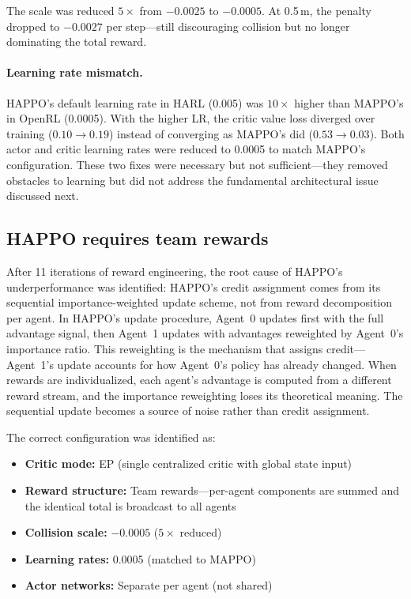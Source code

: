 The scale was reduced $5\times$ from $-0.0025$ to $-0.0005$. At 0.5\,m, the penalty dropped to $-0.0027$ per step---still discouraging collision but no longer dominating the total reward.


\paragraph{Learning rate mismatch.}
HAPPO's default learning rate in HARL (0.005) was $10\times$ higher than MAPPO's in OpenRL (0.0005). With the higher LR, the critic value loss diverged over training ($0.10 \to 0.19$) instead of converging as MAPPO's did ($0.53 \to 0.03$). Both actor and critic learning rates were reduced to 0.0005 to match MAPPO's configuration. These two fixes were necessary but not sufficient---they removed obstacles to learning but did not address the fundamental architectural issue discussed next.

\subsection{HAPPO requires team rewards}
\label{sec:happo_team_rewards}

After 11 iterations of reward engineering, the root cause of HAPPO's underperformance was identified: HAPPO's credit assignment comes from its sequential importance-weighted update scheme, not from reward decomposition per agent. In HAPPO's update procedure, Agent~0 updates first with the full advantage signal, then Agent~1 updates with advantages reweighted by Agent~0's importance ratio. This reweighting is the mechanism that assigns credit---Agent~1's update accounts for how Agent~0's policy has already changed. When rewards are individualized, each agent's advantage is computed from a different reward stream, and the importance reweighting loses its theoretical meaning. The sequential update becomes a source of noise rather than credit assignment.

The correct configuration was identified as:

\begin{itemize}
  \item \textbf{Critic mode:} EP (single centralized critic with global state input)
  \item \textbf{Reward structure:} Team rewards---per-agent components are summed and the identical total is broadcast to all agents
  \item \textbf{Collision scale:} $-0.0005$ ($5\times$ reduced)
  \item \textbf{Learning rates:} 0.0005 (matched to MAPPO)
  \item \textbf{Actor networks:} Separate per agent (not shared)
\end{itemize}

